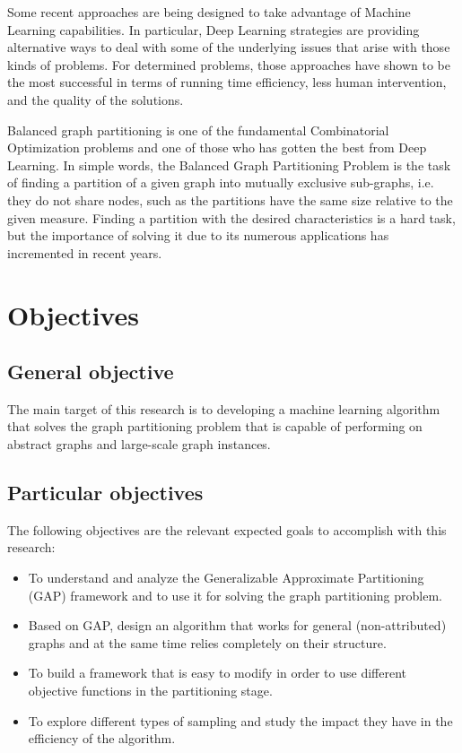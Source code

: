 Some recent approaches are being designed to take advantage of Machine Learning capabilities. In particular, Deep Learning strategies are providing alternative ways to deal with some of the underlying issues that arise with those kinds of problems. For determined problems, those approaches have shown to be the most successful in terms of running time efficiency, less human intervention, and the quality of the solutions.

Balanced graph partitioning is one of the fundamental Combinatorial Optimization problems and one of those who has gotten the best from Deep Learning. In simple words, the Balanced Graph Partitioning Problem is the task of finding a partition of a given graph into mutually exclusive sub-graphs, i.e. they do not share nodes, such as the partitions have the same size relative to the given measure. Finding a partition with the desired characteristics is a hard task, but the importance of solving it due to its numerous applications has incremented in recent years.

\section{Objectives}

\subsection{General objective}
    The main target of this research is to developing a machine learning algorithm that solves the graph partitioning problem that is capable of performing on abstract graphs and large-scale graph instances.
\subsection{Particular objectives}
The following objectives are the relevant expected goals to accomplish with this research:
\begin{itemize}
    \item To understand and analyze the Generalizable Approximate Partitioning (GAP) framework and to use it for solving the graph partitioning problem.
    \item Based on GAP, design an algorithm that works for general (non-attributed) graphs and at the same time relies completely on their structure.
    \item To build a framework that is easy to modify in order to use different objective functions in the partitioning stage.
    \item To explore different types of sampling and study the impact they have in the efficiency of the algorithm.
\end{itemize}
